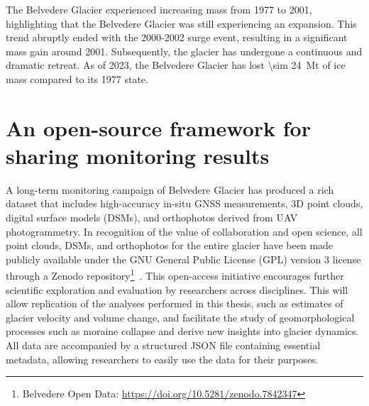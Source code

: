 The Belvedere Glacier experienced increasing mass from 1977 to 2001, highlighting that the Belvedere Glacier was still experiencing an expansion. 
This trend abruptly ended with the 2000-2002 surge event, resulting in a significant mass gain around 2001. 
Subsequently, the glacier has undergone a continuous and dramatic retreat. 
As of 2023, the Belvedere Glacier has lost \SI{\sim 24}{\mega\tonne} of ice mass compared to its 1977 state.

\section{An open-source framework for sharing monitoring results}\label{sec:3:open-data}

A long-term monitoring campaign of Belvedere Glacier has produced a rich dataset that includes high-accuracy in-situ GNSS measurements, 3D point clouds, digital surface models (DSMs), and orthophotos derived from UAV photogrammetry.
In recognition of the value of collaboration and open science, all point clouds, DSMs, and orthophotos for the entire glacier have been made publicly available under the GNU General Public License (GPL) version 3 license through a Zenodo repository\footnote{Belvedere Open Data: \url{https://doi.org/10.5281/zenodo.7842347}}~\citep{ioli_2023_zenodo}.
This open-access initiative encourages further scientific exploration and evaluation by researchers across disciplines.
This will allow replication of the analyses performed in this thesis, such as estimates of glacier velocity and volume change, and facilitate the study of geomorphological processes such as moraine collapse and derive new insights into glacier dynamics. 
All data are accompanied by a structured JSON file containing essential metadata, allowing researchers to easily use the data for their purposes.

